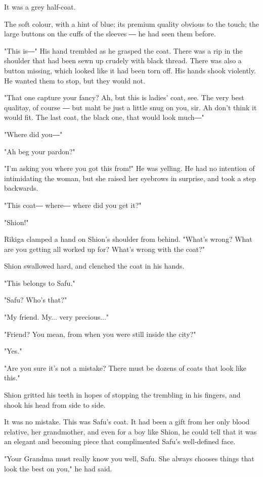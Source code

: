 It was a grey half-coat.

The soft colour, with a hint of blue; its premium quality obvious to the
touch; the large buttons on the cuffs of the sleeves ― he had seen them
before.

"This is―" His hand trembled as he grasped the coat. There was a rip in
the shoulder that had been sewn up crudely with black thread. There was
also a button missing, which looked like it had been torn off. His hands
shook violently. He wanted them to stop, but they would not.

"That one capture your fancy? Ah, but this is ladies' coat, see. The
very best qualitay, of course ― but maht be just a little snug on you,
sir. Ah don't think it would fit. The last coat, the black one, that
would look much―"

"Where did you―"

"Ah beg your pardon?"

"I'm asking you where you got this from!" He was yelling. He had no
intention of intimidating the woman, but she raised her eyebrows in
surprise, and took a step backwards.

"This coat― where― where did you get it?"

"Shion!"

Rikiga clamped a hand on Shion's shoulder from behind. "What's wrong?
What are you getting all worked up for? What's wrong with the coat?"

Shion swallowed hard, and clenched the coat in his hands.

"This belongs to Safu."

"Safu? Who's that?"

"My friend. My... very precious..."

"Friend? You mean, from when you were still inside the city?"

"Yes."

"Are you sure it's not a mistake? There must be dozens of coats that
look like this."

Shion gritted his teeth in hopes of stopping the trembling in his
fingers, and shook his head from side to side.

It was no mistake. This was Safu's coat. It had been a gift from her
only blood relative, her grandmother, and even for a boy like Shion, he
could tell that it was an elegant and becoming piece that complimented
Safu's well-defined face.

"Your Grandma must really know you well, Safu. She always chooses things
that look the best on you," he had said.

